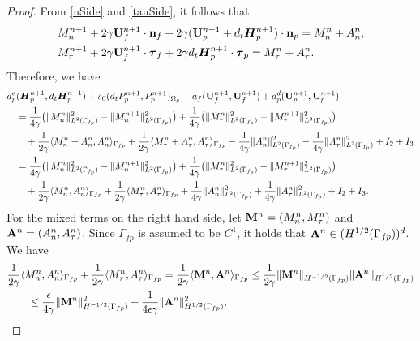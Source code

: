 \documentclass[11pt]{article}
\def\n{{\bf n}}
\def\btau{\boldsymbol{\tau}}
\def\U{{\bf U}}
\def\M{{\bf M}}
\def\A{{\bf A}}
\def\E{\boldsymbol{H}}
\def\O{\Omega}
\def\<{\langle}
\def\>{\rangle}
\def\ddt{d_t}
\begin{document}
\begin{proof}
From \eqref{nSide} and \eqref{tauSide}, it follows that
\begin{alignat*}{1}
&M_n^{n+1} + 2\gamma \U_f^{n+1}\cdot \n_f + 2\gamma (\U_p^{n+1} + \ddt \E_p^{n+1})\cdot \n_p = M_n^n + A_n^n, \\
&M_\tau^{n+1} + 2\gamma \U_f^{n+1} \cdot \btau_f + 2\gamma \ddt \E_p^{n+1} \cdot \btau_p = M_\tau^n + A_\tau^n.
\end{alignat*}
%
Therefore, we have
%
\begin{alignat}{1}
  &
  a_p^e(\E_p^{n+1}, \ddt \E_p^{n+1})
  + s_0(\ddt P_p^{n+1}, P_p^{n+1})_{\O_p}
  + a_f(\U_f^{n+1},\U_f^{n+1})
  + a_p^d (\U_p^{n+1}, \U_p^{n+1})
  \nonumber\\  
&\quad = \frac{1}{4\gamma}\big(\|M_n^n\|_{L^2(\Gamma_{f_p})}^2 -\|M_n^{n+1}\|_{L^2(\Gamma_{f_p})}^2\big) +\frac{1}{4\gamma}\big(\|M_\tau^n\|_{L^2(\Gamma_{f_p})}^2 -\|M_\tau^{n+1}\|_{L^2(\Gamma_{f_p})}^2\big) \nonumber\\
  &\quad \quad   + \frac{1}{2\gamma} \<M_n^n + A_n^n, A_n^n\>_{\Gamma_{fp}}+ \frac{1}{2\gamma}\<M_\tau^{n} + A_\tau^n, A_\tau^n\>_{\Gamma_{fp}}
  - \frac{1}{4\gamma}\|A_n^n\|_{L^2(\Gamma_{f_p})}^2   -\frac{1}{4\gamma} \|A_\tau^n\|_{L^2(\Gamma_{f_p})}^2
  + I_2 + I_3 \nonumber\\
&\quad = \frac{1}{4\gamma}\big(\|M_n^n\|_{L^2(\Gamma_{f_p})}^2 -\|M_n^{n+1}\|_{L^2(\Gamma_{f_p})}^2\big) +\frac{1}{4\gamma}\big(\|M_\tau^n\|_{L^2(\Gamma_{f_p})}^2 -\|M_\tau^{n+1}\|_{L^2(\Gamma_{f_p})}^2\big) \nonumber\\
  &\quad \quad  + \frac{1}{2\gamma} \<M_n^n, A_n^n\>_{\Gamma_{fp}}
  + \frac{1}{2\gamma}\<M_\tau^{n} , A_\tau^n\>_{\Gamma_{fp}}
  + \frac{1}{4\gamma}\|A_n^n\|_{L^2(\Gamma_{f_p})}^2
  + \frac{1}{4\gamma} \|A_\tau^n\|_{L^2(\Gamma_{f_p})}^2
  + I_2 + I_3. \label{stop1}
\end{alignat}
%
For the mixed terms on the right hand side, let $\M^n = (M_n^n,M_\tau^n)$ and $\A^n = (A_n^n,A_\tau^n)$. Since $\Gamma_{fp}$ is assumed to be $C^1$, it holds that $\A^n \in (H^{1/2}(\Gamma_{fp}))^d$. We have
%  
\begin{align}
& \frac{1}{2\gamma}\<M_n^n, A_n^n\>_{\Gamma_{fp}}
+ \frac{1}{2\gamma}\<M_\tau^{n} , A_\tau^n\>_{\Gamma_{fp}} = \frac{1}{2\gamma}\<\M^n,\A^n\>_{\Gamma_{fp}} \le \frac{1}{2\gamma}\|\M^n\|_{H^{-1/2}(\Gamma_{fp})}\|\A^n\|_{H^{1/2}(\Gamma_{fp})} \nonumber \\
& \qquad \le \frac{\epsilon}{4\gamma}\|\M^n\|_{H^{-1/2}(\Gamma_{fp})}^2 + \frac{1}{4\epsilon\gamma}\|\A^n\|_{H^{1/2}(\Gamma_{fp})}^2,\label{mixed-1}
\end{align}

\end{proof}
\end{document}

